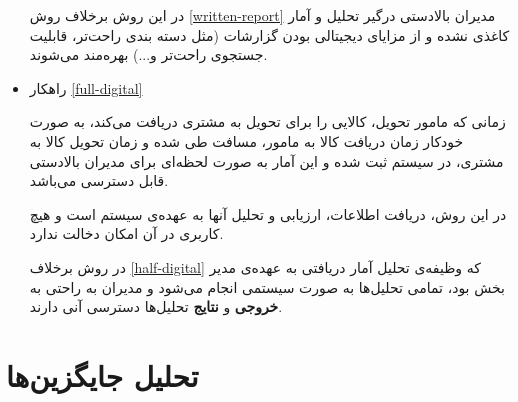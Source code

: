 \documentclass[12pt]{article}
\begin{document}
\begin{itemize}
    در این روش برخلاف روش \ref{written-report} مدیران بالادستی درگیر تحلیل و آمار کاغذی نشده و از مزایای دیجیتالی بودن گزارشات (مثل دسته بندی راحت‌تر، قابلیت جستجو‌ی راحت‌تر و...) بهره‌مند می‌شوند.
    \item راهکار \ref{full-digital}
    
    زمانی که مامور تحویل، کالایی را برای تحویل به مشتری دریافت می‌کند، به صورت خودکار زمان دریافت کالا به مامور، مسافت طی شده و زمان تحویل کالا به مشتری، در سیستم ثبت شده و این آمار به صورت لحظه‌‌ای برای مدیران بالادستی قابل دسترسی می‌باشد.
    
    در این روش، دریافت اطلاعات، ارزیابی و تحلیل آنها به عهده‌ی سیستم است و هیچ کاربری در آن امکان دخالت ندارد. 
    
    در روش برخلاف \ref{half-digital} که وظیفه‌ی تحلیل آمار دریافتی به عهده‌ی مدیر بخش بود، تمامی تحلیل‌ها به صورت سیستمی انجام می‌شود و مدیران به راحتی به \textbf{خروجی} و \textbf{نتایج} تحلیل‌ها دسترسی آنی دارند.
    
\end{itemize}

\section{تحلیل جایگزین‌ها}
\end{document}
